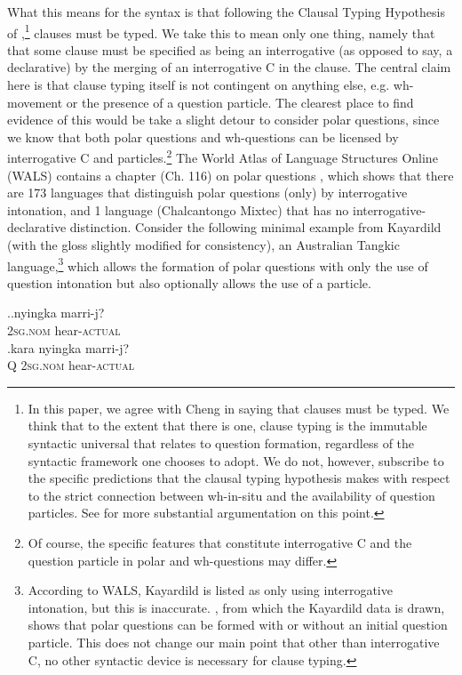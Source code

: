 \documentclass[charis]{glossa}
\begin{document}
What this means for the syntax is that following the Clausal Typing Hypothesis of \cite{cheng:1997},\footnote{In this paper, we agree with Cheng in saying that clauses must be typed. We think that to the extent that there is one, clause typing is the immutable syntactic universal that relates to question formation, regardless of the syntactic framework one chooses to adopt. We do not, however, subscribe to the specific predictions that the clausal typing hypothesis makes with respect to the strict connection between wh-in-situ and the availability of question particles. See \cite{bruening:2007} for more substantial argumentation on this point.} clauses must be typed. We take this to mean only one thing, namely that that some clause must be specified as being an interrogative (as opposed to say, a declarative) by the merging of an interrogative C in the clause. The central claim here is that clause typing itself is not contingent on anything else, e.g. wh-movement or the presence of a question particle. The clearest place to find evidence of this would be take a slight detour to consider polar questions, since we know that both polar questions and wh-questions can be licensed by interrogative C and particles.\footnote{Of course, the specific features that constitute interrogative C and the question particle in polar and wh-questions may differ.} The World Atlas of Language Structures Online (WALS) contains a chapter (Ch. 116) on polar questions \citep{wals116:2013}, which shows that there are 173 languages that distinguish polar questions (only) by interrogative intonation, and 1 language (Chalcantongo Mixtec) that has no interrogative-declarative distinction. Consider the following minimal example from Kayardild (with the gloss slightly modified for consistency), an Australian Tangkic language,\footnote{According to WALS, Kayardild is listed as only using interrogative intonation, but this is inaccurate. \cite{evans:1995}, from which the Kayardild data is drawn, shows that polar questions can be formed with or without an initial question particle. This does not change our main point that other than interrogative C, no other syntactic device is necessary for clause typing.} which allows the formation of polar questions with only the use of question intonation but also optionally allows the use of a particle.

\ex.\ag.\label{wh.101a}nyingka marri-j?\\
   \textsc{2sg.nom} hear-\textsc{actual}\\
   \bg.\label{wh.101b}kara nyingka marri-j?\\
   Q \textsc{2sg.nom} hear-\textsc{actual}\\
   \hspace{\fill}\citep[364--365]{evans:1995}
\end{document}
